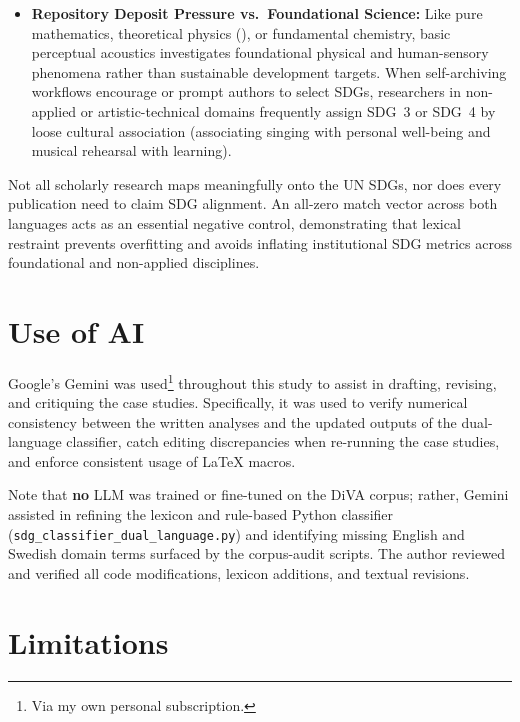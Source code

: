\begin{casestudySection}
\begin{itemize}
    \item \textbf{Repository Deposit Pressure vs.\ Foundational Science:} Like pure mathematics, theoretical physics (\eg {}), or fundamental chemistry, basic perceptual acoustics investigates foundational physical and human-sensory phenomena rather than sustainable development targets. When self-archiving workflows encourage or prompt authors to select \glspl{SDG}, researchers in non-applied or artistic-technical domains frequently assign \gls{SDG}~3 or \gls{SDG}~4 by loose cultural association (\eg associating singing with personal well-being and musical rehearsal with learning).
\end{itemize}
\end{casestudySection}

\begin{takeaway}
Not all scholarly research maps meaningfully onto the \gls{UN} \glspl{SDG}, nor does every publication need to claim \gls{SDG} alignment. An all-zero match vector across both languages acts as an essential negative control, demonstrating that lexical restraint prevents overfitting and avoids inflating institutional \gls{SDG} metrics across foundational and non-applied disciplines.
\end{takeaway}
\clearpage
\section{Use of AI}
\label{sec:UseofAI}

Google's Gemini was used\footnote{Via my own personal subscription.} throughout this study to assist in drafting, revising, and critiquing the case studies. Specifically, it was used to verify numerical consistency between the written analyses and the updated outputs of the dual-language classifier, catch editing discrepancies when re-running the case studies, and enforce consistent usage of \LaTeX{} macros.

Note that \textbf{no} \gls{LLM} was trained or fine-tuned on the \gls{DiVA} corpus; rather, Gemini assisted in refining the lexicon and rule-based Python classifier (\texttt{sdg\_classifier\_dual\_language.py}) and identifying missing English and Swedish domain terms surfaced by the corpus-audit scripts. The author reviewed and verified all code modifications, lexicon additions, and textual revisions.

\clearpage
\section{Limitations}
\label{sec:Limitations}

